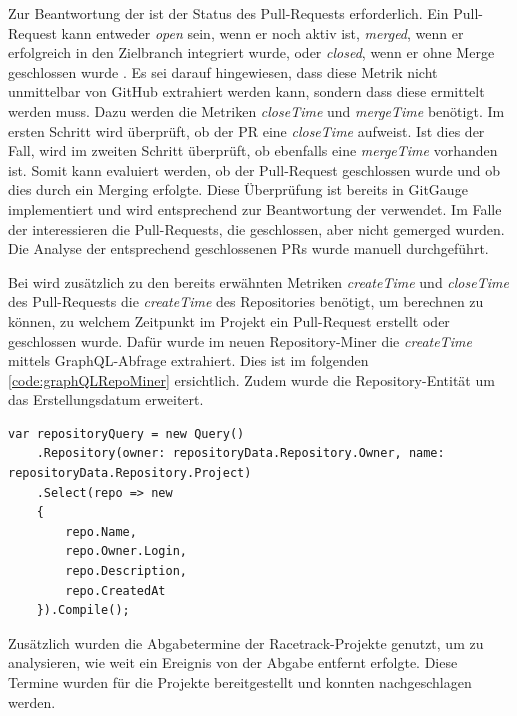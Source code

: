 Zur Beantwortung der  ist der Status des Pull-Requests erforderlich. Ein Pull-Request kann entweder \textit{open} sein, wenn er noch aktiv ist, \textit{merged}, wenn er erfolgreich in den Zielbranch integriert wurde, oder \textit{closed}, wenn er ohne Merge geschlossen wurde \parencite{noauthor_enums_nodate}. Es sei darauf hingewiesen, dass diese Metrik nicht unmittelbar von GitHub extrahiert werden kann, sondern dass diese ermittelt werden muss. Dazu werden die Metriken \textit{closeTime} und \textit{mergeTime} benötigt. Im ersten Schritt wird überprüft, ob der PR  eine \textit{closeTime} aufweist. Ist dies der Fall, wird im zweiten Schritt überprüft, ob ebenfalls eine \textit{mergeTime} vorhanden ist. Somit kann evaluiert werden, ob der Pull-Request geschlossen wurde und ob dies durch ein Merging erfolgte. Diese Überprüfung ist bereits in GitGauge implementiert und wird entsprechend zur Beantwortung der  verwendet. Im Falle der  interessieren die Pull-Requests, die geschlossen, aber nicht gemerged wurden. Die Analyse der entsprechend geschlossenen PRs wurde manuell durchgeführt.

Bei  wird zusätzlich zu den bereits erwähnten Metriken \textit{createTime} und \textit{closeTime} des Pull-Requests die \textit{createTime} des Repositories benötigt, um berechnen zu können, zu welchem Zeitpunkt im Projekt ein Pull-Request erstellt oder geschlossen wurde.  Dafür wurde im neuen Repository-Miner die \textit{createTime } mittels GraphQL-Abfrage extrahiert. Dies ist im folgenden \autoref{code:graphQLRepoMiner} ersichtlich. Zudem wurde die Repository-Entität um das Erstellungsdatum erweitert. 
\begin{lstlisting}[language=CSharp, caption={GraphQL-Abfrage Repository}, label={code:graphQLRepoMiner}]
var repositoryQuery = new Query()
    .Repository(owner: repositoryData.Repository.Owner, name: repositoryData.Repository.Project)
    .Select(repo => new
    {
        repo.Name,
        repo.Owner.Login,
        repo.Description,
        repo.CreatedAt
    }).Compile();
\end{lstlisting}

Zusätzlich wurden die Abgabetermine der Racetrack-Projekte genutzt, um zu analysieren, wie weit ein Ereignis von der Abgabe entfernt erfolgte. Diese Termine wurden für die Projekte bereitgestellt und konnten nachgeschlagen werden.

